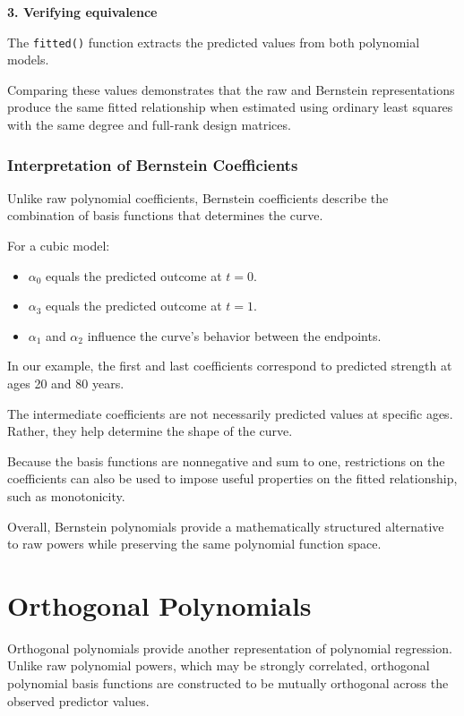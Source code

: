 \documentclass[
  letterpaper,
  DIV=11,
  numbers=noendperiod]{scrreprt}
\providecommand{\tightlist}{%
  \setlength{\itemsep}{0pt}\setlength{\parskip}{0pt}}
\begin{document}
\textbf{3. Verifying equivalence}

The \texttt{fitted()} function extracts the predicted values from both
polynomial models.

Comparing these values demonstrates that the raw and Bernstein
representations produce the same fitted relationship when estimated
using ordinary least squares with the same degree and full-rank design
matrices.

\subsubsection{Interpretation of Bernstein
Coefficients}\label{interpretation-of-bernstein-coefficients}

Unlike raw polynomial coefficients, Bernstein coefficients describe the
combination of basis functions that determines the curve.

For a cubic model:

\begin{itemize}
\tightlist
\item
  \(\alpha_0\) equals the predicted outcome at \(t=0\).
\item
  \(\alpha_3\) equals the predicted outcome at \(t=1\).
\item
  \(\alpha_1\) and \(\alpha_2\) influence the curve's behavior between
  the endpoints.
\end{itemize}

In our example, the first and last coefficients correspond to predicted
strength at ages 20 and 80 years.

The intermediate coefficients are not necessarily predicted values at
specific ages. Rather, they help determine the shape of the curve.

Because the basis functions are nonnegative and sum to one, restrictions
on the coefficients can also be used to impose useful properties on the
fitted relationship, such as monotonicity.

Overall, Bernstein polynomials provide a mathematically structured
alternative to raw powers while preserving the same polynomial function
space.

\section{Orthogonal Polynomials}\label{orthogonal-polynomials}

Orthogonal polynomials provide another representation of polynomial
regression. Unlike raw polynomial powers, which may be strongly
correlated, orthogonal polynomial basis functions are constructed to be
mutually orthogonal across the observed predictor values.
\end{document}
